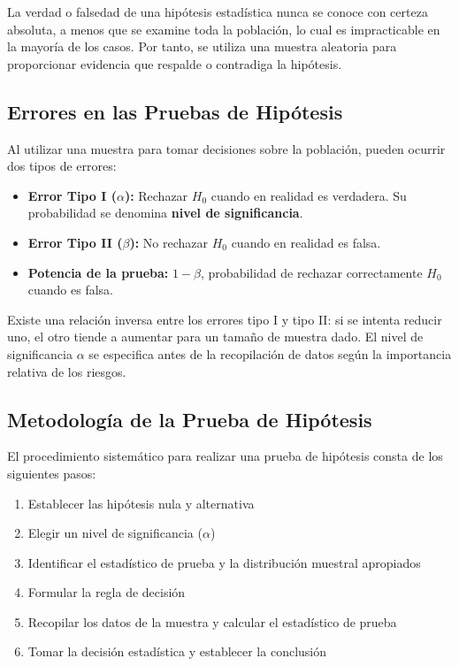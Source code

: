 \begin{remark}
La verdad o falsedad de una hipótesis estadística nunca se conoce con certeza absoluta, a menos que se examine toda la población, lo cual es impracticable en la mayoría de los casos. Por tanto, se utiliza una muestra aleatoria para proporcionar evidencia que respalde o contradiga la hipótesis.
\end{remark}

\subsection{Errores en las Pruebas de Hipótesis}

\begin{definition}
Al utilizar una muestra para tomar decisiones sobre la población, pueden ocurrir dos tipos de errores:
\begin{itemize}
    \item \textbf{Error Tipo I ($\alpha$):} Rechazar $H_0$ cuando en realidad es verdadera. Su probabilidad se denomina \textbf{nivel de significancia}.
    \item \textbf{Error Tipo II ($\beta$):} No rechazar $H_0$ cuando en realidad es falsa.
    \item \textbf{Potencia de la prueba:} $1-\beta$, probabilidad de rechazar correctamente $H_0$ cuando es falsa.
\end{itemize}
\end{definition}

\begin{remark}
Existe una relación inversa entre los errores tipo I y tipo II: si se intenta reducir uno, el otro tiende a aumentar para un tamaño de muestra dado. El nivel de significancia $\alpha$ se especifica antes de la recopilación de datos según la importancia relativa de los riesgos.
\end{remark}

\subsection{Metodología de la Prueba de Hipótesis}

\begin{theorem}
El procedimiento sistemático para realizar una prueba de hipótesis consta de los siguientes pasos:
\begin{enumerate}
    \item Establecer las hipótesis nula y alternativa
    \item Elegir un nivel de significancia ($\alpha$)
    \item Identificar el estadístico de prueba y la distribución muestral apropiados
    \item Formular la regla de decisión
    \item Recopilar los datos de la muestra y calcular el estadístico de prueba
    \item Tomar la decisión estadística y establecer la conclusión
\end{enumerate}
\end{theorem}

